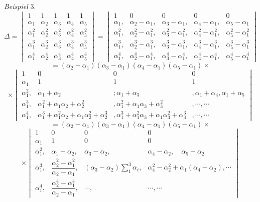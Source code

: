\textit{Beispiel} 3.
\[
\varDelta = \begin{vmatrix} 1 & 1 & 1 & 1 & 1\\ \alpha_1 & \alpha_2 & \alpha_3 & \alpha_4 & \alpha_5\\ \alpha_1^2 & \alpha_2^2 & \alpha_3^2 & \alpha_4^2 & \alpha_5^2\\ \alpha_1^3 & \alpha_2^3 & \alpha_3^3 & \alpha_4^3 & \alpha_5^3\\ \alpha_1^4 & \alpha_2^4 & \alpha_3^4 & \alpha_4^4 & \alpha_5^4\end{vmatrix}
= \begin{vmatrix}
1 & 0 & 0 & 0 & 0\\
\alpha_1, & \alpha_2-\alpha_1, & \alpha_3-\alpha_1, & \alpha_4-\alpha_1, & \alpha_5-\alpha_1\\
\alpha_1^2, & \alpha_2^2-\alpha_1^2, & \alpha_3^2-\alpha_1^2, & \alpha_4^2-\alpha_1^2, & \alpha_5^2-\alpha_1^2\\
\alpha_1^3, & \alpha_2^3-\alpha_1^3, & \alpha_3^3-\alpha_1^3, & \alpha_4^3-\alpha_1^3, & \alpha_5^3-\alpha_1^3\\
\alpha_1^4, & \alpha_2^4-\alpha_1^4, & \alpha_3^4-\alpha_1^4, & \alpha_4^4-\alpha_1^4, & \alpha_5^4-\alpha_1^4
\end{vmatrix}
\]
\[
= (\alpha_2-\alpha_1)(\alpha_3-\alpha_1)(\alpha_4-\alpha_1)(\alpha_5-\alpha_1) \times
\]
\[
\times \begin{vmatrix}
1 & 0 & 0 & 0\\
\alpha_1 & 1 & 1 & 1\\
\alpha_1^2, & \alpha_1+\alpha_2 & {}; \alpha_1+\alpha_3 & , \alpha_1+\alpha_4, \alpha_1+\alpha_5\\
\alpha_1^3, & \alpha_1^2+\alpha_1\alpha_2+\alpha_2^2 & , \alpha_1^2+\alpha_1\alpha_3+\alpha_3^2 & , \cdots, \cdots\\
\alpha_1^4, & \alpha_1^3+\alpha_1^2\alpha_2+\alpha_1\alpha_2^2+\alpha_2^3 & , \alpha_1^3+\alpha_1^2\alpha_3+\alpha_1\alpha_3^2+\alpha_3^3 & , \cdots, \cdots
\end{vmatrix}
\]
\[
= (\alpha_2-\alpha_1)(\alpha_3-\alpha_1)(\alpha_4-\alpha_1)(\alpha_5-\alpha_1) \times
\]
\[
\times \begin{vmatrix}
1 & 0 & 0 & 0\\
\alpha_1 & 1 & 0 & 0\\
\alpha_1^2, & \alpha_1+\alpha_2, & \alpha_3-\alpha_2, & \alpha_4-\alpha_2, \quad \alpha_5-\alpha_2\\
\alpha_1^3, & \dfrac{\alpha_2^2-\alpha_1^2}{\alpha_2-\alpha_1}, & (\alpha_3-\alpha_2)\displaystyle\sum_{1}^{3}\alpha_i, & \alpha_4^2-\alpha_2^2+\alpha_1(\alpha_4-\alpha_2), \cdots\\
\alpha_1^4, & \dfrac{\alpha_2^4-\alpha_1^4}{\alpha_2-\alpha_1}, & \cdots, & \cdots, \cdots
\end{vmatrix}
\]
